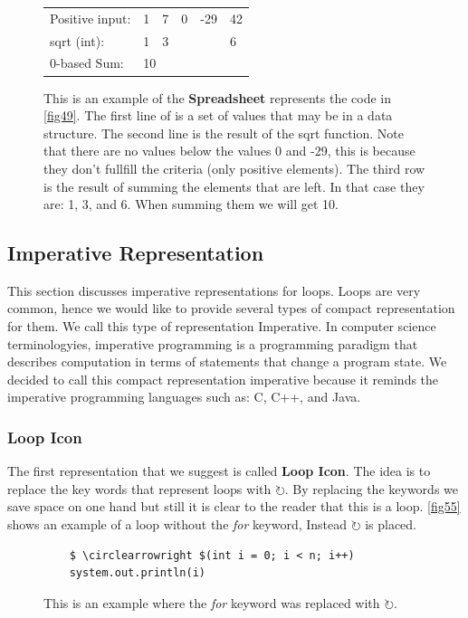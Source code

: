 \begin{figure}[H]
	\begin{table}[H]
		\centering
		\begin{tabular}{llllll}
			Positive input: & 1  & 7  & 0 & -29 & 42 \\
			sqrt (int):     & 1  & 3  &   &     & 6  \\ \hline
			0-based Sum:    & \multicolumn{5}{l}{10} \\
		\end{tabular}
	\end{table}
	\caption{This is an example of the \textbf{Spreadsheet} represents the code in \autoref{fig49}. The first line of is a set of values that may be in a data structure. The second line is the result of the sqrt function. Note that there are no values below the values 0 and -29, this is because they don't fullfill the criteria (only positive elements). The third row is the result of summing the elements that are left. In that case they are: 1, 3, and 6. When summing them we will get 10.}
	\label{fig54}
\end{figure}
\subsection{Imperative Representation}
This section discusses imperative representations for loops. Loops are very common, hence we would like to provide several types of compact representation for them. We call this type of representation Imperative. In computer science terminologyies, imperative programming is a programming paradigm that describes computation in terms of statements that change a program state. We decided to call this compact representation imperative because it reminds the imperative programming languages such as: C, C++, and Java.

\subsubsection{Loop Icon}
The first representation that we suggest is called \textbf{Loop Icon}. The idea is to replace the key words that represent loops with $ \circlearrowright $. By replacing the keywords we save space on one hand but still it is clear to the reader that this is a loop. \autoref{fig55} shows an example of a loop without the \textit{for} keyword, Instead $ \circlearrowright $ is placed.
\begin{figure}[H]
	\begin{lstlisting}
	$ \circlearrowright $(int i = 0; i < n; i++)
	system.out.println(i)
	\end{lstlisting}
	\caption{This is an example where the \textit{for} keyword was replaced with $ \circlearrowright $.}
	\label{fig55}
\end{figure}
